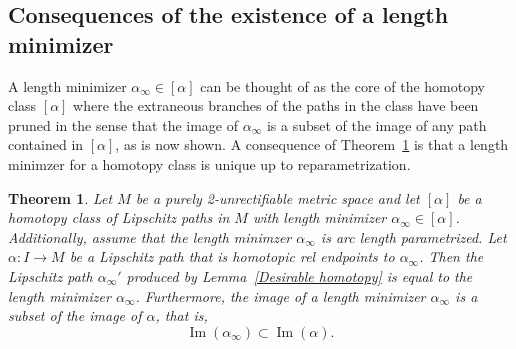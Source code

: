 \documentclass{article}
\newtheorem{theorem}{Theorem}[section]
\theoremstyle{definition}
\theoremstyle{remark}
\DeclareMathOperator{\Ima}{Im}
\newcommand{\core}[1]{{#1}_\infty}
\begin{document}
\subsection{Consequences of the existence of a length minimizer}

A length minimizer $\core{\alpha}\in[\alpha]$ can be thought of as the core of the homotopy class $[\alpha]$ where the extraneous branches of the paths in the class have been pruned in the sense that the image of $\core{\alpha}$ is a subset of the image of any path contained in $[\alpha]$, as is now shown. A consequence of Theorem~\ref{uniqueness of core} is that a length minimzer for a homotopy class is unique up to reparametrization.

\begin{theorem}\label{uniqueness of core}
Let $M$ be a purely 2-unrectifiable metric space and let $[\alpha]$ be a homotopy class of Lipschitz paths in $M$ with length minimizer $\core{\alpha}\in[\alpha]$. Additionally, assume that the length minimzer $\core{\alpha}$ is arc length parametrized. Let $\alpha:I\rightarrow M$ be a Lipschitz path that is  homotopic rel endpoints to $\core{\alpha}$. Then the Lipschitz path $\core{\alpha}'$ produced by Lemma~\ref{Desirable homotopy} is equal to the length minimizer $\core{\alpha}$. Furthermore, the image of a length minimizer $\core{\alpha}$ is a subset of the image of $\alpha$, that is,
\[
\Ima(\core{\alpha})\subset\Ima(\alpha).
\]
\end{theorem}
\end{document}
